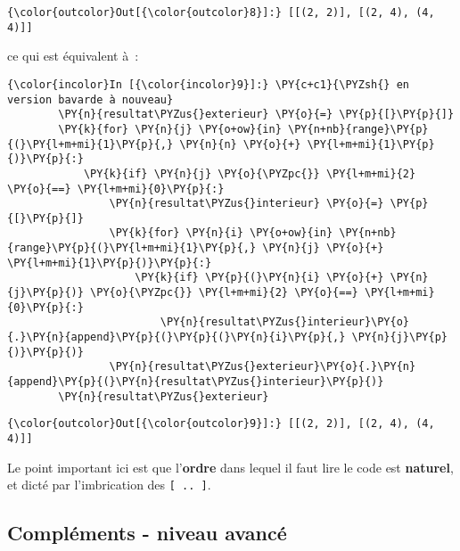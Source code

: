 \begin{Verbatim}[commandchars=\\\{\},frame=single,framerule=0.3mm,rulecolor=\color{cellframecolor}]
{\color{outcolor}Out[{\color{outcolor}8}]:} [[(2, 2)], [(2, 4), (4, 4)]]
\end{Verbatim}
            
    ce qui est équivalent à~:

    \begin{Verbatim}[commandchars=\\\{\},frame=single,framerule=0.3mm,rulecolor=\color{cellframecolor}]
{\color{incolor}In [{\color{incolor}9}]:} \PY{c+c1}{\PYZsh{} en version bavarde à nouveau}
        \PY{n}{resultat\PYZus{}exterieur} \PY{o}{=} \PY{p}{[}\PY{p}{]}
        \PY{k}{for} \PY{n}{j} \PY{o+ow}{in} \PY{n+nb}{range}\PY{p}{(}\PY{l+m+mi}{1}\PY{p}{,} \PY{n}{n} \PY{o}{+} \PY{l+m+mi}{1}\PY{p}{)}\PY{p}{:}
            \PY{k}{if} \PY{n}{j} \PY{o}{\PYZpc{}} \PY{l+m+mi}{2} \PY{o}{==} \PY{l+m+mi}{0}\PY{p}{:}
                \PY{n}{resultat\PYZus{}interieur} \PY{o}{=} \PY{p}{[}\PY{p}{]}
                \PY{k}{for} \PY{n}{i} \PY{o+ow}{in} \PY{n+nb}{range}\PY{p}{(}\PY{l+m+mi}{1}\PY{p}{,} \PY{n}{j} \PY{o}{+} \PY{l+m+mi}{1}\PY{p}{)}\PY{p}{:}
                    \PY{k}{if} \PY{p}{(}\PY{n}{i} \PY{o}{+} \PY{n}{j}\PY{p}{)} \PY{o}{\PYZpc{}} \PY{l+m+mi}{2} \PY{o}{==} \PY{l+m+mi}{0}\PY{p}{:}
                        \PY{n}{resultat\PYZus{}interieur}\PY{o}{.}\PY{n}{append}\PY{p}{(}\PY{p}{(}\PY{n}{i}\PY{p}{,} \PY{n}{j}\PY{p}{)}\PY{p}{)}
                \PY{n}{resultat\PYZus{}exterieur}\PY{o}{.}\PY{n}{append}\PY{p}{(}\PY{n}{resultat\PYZus{}interieur}\PY{p}{)}
        \PY{n}{resultat\PYZus{}exterieur}
\end{Verbatim}


\begin{Verbatim}[commandchars=\\\{\},frame=single,framerule=0.3mm,rulecolor=\color{cellframecolor}]
{\color{outcolor}Out[{\color{outcolor}9}]:} [[(2, 2)], [(2, 4), (4, 4)]]
\end{Verbatim}
            
    Le point important ici est que l'\textbf{ordre} dans lequel il faut lire
le code est \textbf{naturel}, et dicté par l'imbrication des
\texttt{{[}\ ..\ {]}}.

    \hypertarget{compluxe9ments---niveau-avancuxe9}{%
\subsection{Compléments - niveau
avancé}\label{compluxe9ments---niveau-avancuxe9}}

